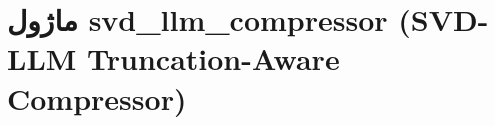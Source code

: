 \section{ماژول svd\_llm\_compressor (SVD-LLM Truncation-Aware Compressor)}
\label{sec:module_svd_llm_compressor}

